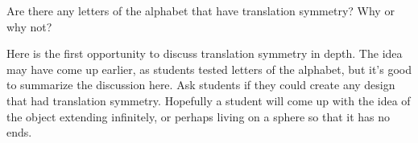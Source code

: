\documentclass{ximera}
\begin{document}
\begin{problem}
Are there any letters of the alphabet that have translation symmetry?  Why or why not?
\begin{instructorNotes}
Here is the first opportunity to discuss translation symmetry in depth.  The idea may have come up earlier, as students tested letters of the alphabet, but it's good to summarize the discussion here.  Ask students if they could create any design that had translation symmetry.  Hopefully a student will come up with the idea of the object extending infinitely, or perhaps living on a sphere so that it has no ends.
\end{instructorNotes}
\end{problem}
\end{document}

